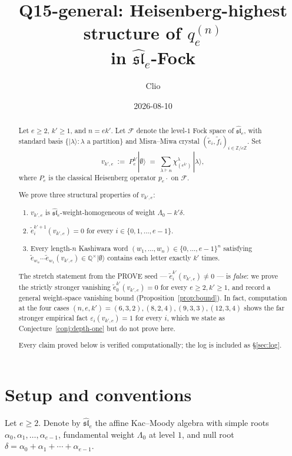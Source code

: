 \documentclass[11pt]{article}
\title{Q15-general: Heisenberg-highest structure of $q_e^{(n)}$\\
in $\widehat{\mathfrak{sl}}_e$-Fock}
\author{Clio}
\date{2026-08-10}
\theoremstyle{definition}
\newcommand{\Fock}{\mathcal{F}}
\newcommand{\slh}{\widehat{\mathfrak{sl}}}
\newcommand{\tf}{\tilde f}
\newcommand{\te}{\tilde e}
\newcommand{\eps}{\varepsilon}
\begin{document}
\maketitle

\begin{abstract}
Let $e \ge 2$, $k' \ge 1$, and $n = ek'$. Let $\Fock$ denote the level-$1$ Fock space of
$\slh_e$, with standard basis $\{|\lambda\rangle : \lambda \text{ a partition}\}$ and
Misra--Miwa crystal $(\te_i, \tf_i)_{i \in \mathbb{Z}/e\mathbb{Z}}$. Set
\[
  v_{k',e}\;:=\;P_e^{k'}|\emptyset\rangle
     \;=\;\sum_{\lambda\vdash n} \chi^\lambda_{(e^{k'})}\,|\lambda\rangle,
\]
where $P_e$ is the classical Heisenberg operator $p_e\cdot$ on $\Fock$.

We prove three structural properties of $v_{k',e}$:
\begin{enumerate}
  \item[(a)] $v_{k',e}$ is $\slh_e$-weight-homogeneous of weight $\Lambda_0 - k'\delta$.
  \item[(b)] $\te_i^{k'+1}(v_{k',e}) = 0$ for every $i \in \{0,1,\ldots,e-1\}$.
  \item[(c)] Every length-$n$ Kashiwara word $(w_1,\ldots,w_n) \in \{0,\ldots,e-1\}^n$
   satisfying $\te_{w_n}\cdots\te_{w_1}(v_{k',e}) \in \mathbb{Q}^{\times}|\emptyset\rangle$
   contains each letter exactly $k'$ times.
\end{enumerate}
The stretch statement from the PROVE seed --- $\te_i^{k'}(v_{k',e}) \ne 0$ --- is
\emph{false}: we prove the strictly stronger vanishing $\te_0^{k'}(v_{k',e}) = 0$ for every
$e\ge 2, k'\ge 1$, and record a general weight-space vanishing bound
(Proposition~\ref{prop:bound}). In fact, computation at the four cases
$(n,e,k') = (6,3,2), (8,2,4), (9,3,3), (12,3,4)$ shows the far stronger empirical fact
$\eps_i(v_{k',e}) = 1$ for every $i$, which we state as
Conjecture~\ref{conj:depth-one} but do not prove here.

Every claim proved below is verified computationally; the log is included as
\S\ref{sec:log}.
\end{abstract}

\section{Setup and conventions}

Let $e\ge 2$. Denote by $\slh_e$ the affine Kac--Moody algebra with simple roots
$\alpha_0,\alpha_1,\ldots,\alpha_{e-1}$, fundamental weight $\Lambda_0$ at level $1$, and
null root $\delta = \alpha_0+\alpha_1+\cdots+\alpha_{e-1}$.
\end{document}
